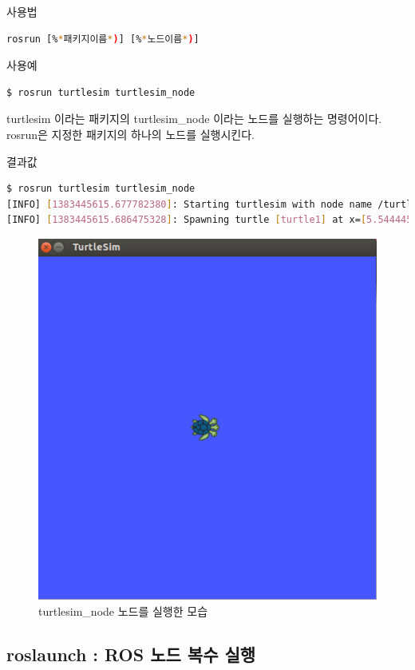 \setcounter{num}{0}

\vspace{\baselineskip}
\noindent
{}\circled{\thenum} 사용법
\begin{lstlisting}[language=bash]
rosrun [%*패키지이름*)] [%*노드이름*)]
\end{lstlisting}

\noindent
{}\circled{\thenum} 사용예
\begin{lstlisting}[language=bash]
$ rosrun turtlesim turtlesim_node 
\end{lstlisting}

\noindent
turtlesim 이라는 패키지의 turtlesim\_node 이라는 노드를 실행하는 명령어이다. rosrun은 지정한 패키지의 하나의 노드를 실행시킨다. 

\vspace{\baselineskip}
\noindent
{}\circled{\thenum} 결과값
\begin{lstlisting}[language=bash]
$ rosrun turtlesim turtlesim_node 
[INFO] [1383445615.677782380]: Starting turtlesim with node name /turtlesim
[INFO] [1383445615.686475328]: Spawning turtle [turtle1] at x=[5.544445], y=[5.544445], theta=[0.000000]
\end{lstlisting}

\begin{figure}[h]
\centering\includegraphics[width=0.6\columnwidth]{pictures/chapter5/term_rosrun.png}
\caption{turtlesim\_node 노드를 실행한 모습}
\end{figure}

\subsection{roslaunch : ROS 노드 복수 실행}

